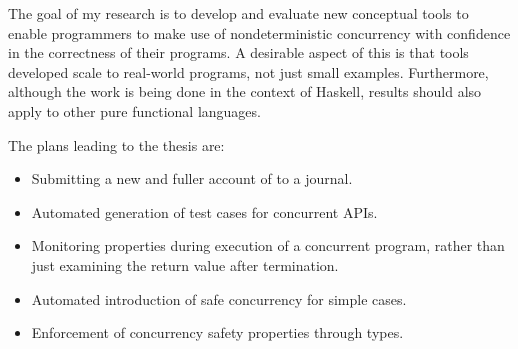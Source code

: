 The goal of my research is to develop and evaluate new conceptual
tools to enable programmers to make use of nondeterministic
concurrency with confidence in the correctness of their programs. A
desirable aspect of this is that tools developed scale to real-world
programs, not just small examples. Furthermore, although the work is
being done in the context of Haskell, results should also apply to
other pure functional languages.

The plans leading to the thesis are:

\begin{itemize}
\item Submitting a new and fuller account of \dejafu{} to a journal.

\item Automated generation of test cases for concurrent APIs.

\item Monitoring properties during execution of a concurrent program,
  rather than just examining the return value after termination.

\item Automated introduction of safe concurrency for simple cases.

\item Enforcement of concurrency safety properties through types.
\end{itemize}
